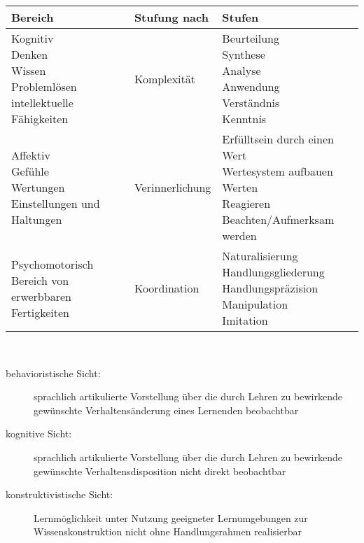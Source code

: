 \documentclass[a4paper]{article}
\begin{document}
\begin{tabular}{ p{4.5cm} p{4.5cm} p{4.5cm} }\toprule[1.5pt]			
	\bf Bereich
	& \bf Stufung nach
	& \bf Stufen
	\\ \midrule
	
	\makecell[l]{Kognitiv\\ Denken\\ Wissen\\ Problemlösen\\ intellektuelle Fähigkeiten}				
	& Komplexität		   	
	& \makecell[l]{Beurteilung\\ Synthese\\ Analyse\\ Anwendung\\ Verständnis\\ Kenntnis}
	\\ \midrule
	
	\makecell[l]{Affektiv\\ Gefühle\\ Wertungen\\ Einstellungen und Haltungen}
	& Verinnerlichung
	& \makecell[l]{Erfülltsein durch einen Wert\\ Wertesystem aufbauen\\ Werten\\ Reagieren\\ Beachten/Aufmerksam werden}
	\\ \midrule
	
	\makecell[l]{Psychomotorisch\\ Bereich von erwerbbaren\\ Fertigkeiten}
	& Koordination
	& \makecell[l]{Naturalisierung\\ Handlungsgliederung\\ Handlungspräzision\\ Manipulation\\ Imitation}
	\\
	
	\bottomrule[1.5pt]
\end{tabular}
~\\
\begin{description}
	\item[behavioristische Sicht:] sprachlich artikulierte Vorstellung über die durch Lehren zu bewirkende gewünschte Verhaltensänderung eines Lernenden \textrightarrow beobachtbar
	\item[kognitive Sicht:] sprachlich artikulierte Vorstellung über die durch Lehren zu bewirkende gewünschte Verhaltensdisposition \textrightarrow nicht direkt beobachtbar
	\item[konstruktivistische Sicht:] Lernmöglichkeit unter Nutzung geeigneter Lernumgebungen zur Wissenskonstruktion \textrightarrow nicht ohne Handlungsrahmen realisierbar
\end{description}
\end{document}
